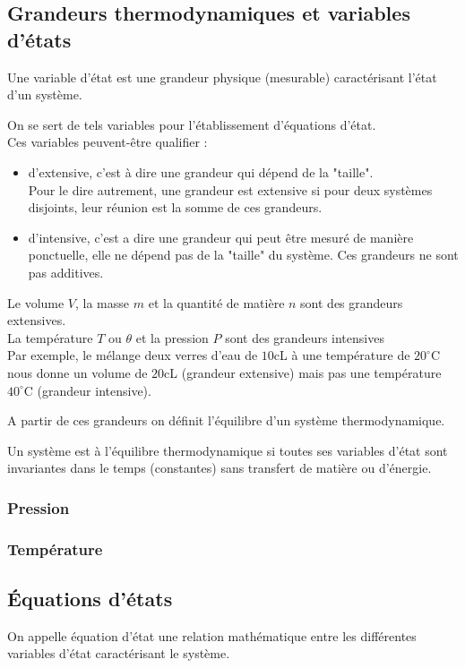 \subsection{Grandeurs thermodynamiques et variables d'états}
\begin{defi}
Une variable d'état est une grandeur physique (mesurable) caractérisant l'état d'un système.
\end{defi}
On se sert de tels variables pour l'établissement d'équations d'état.\\
\newline
Ces variables peuvent-être qualifier :
\begin{itemize}
    \item d'extensive, c'est à dire une grandeur qui dépend de la "taille".\\
    Pour le dire autrement, une grandeur est extensive si pour deux systèmes disjoints, leur réunion est la somme de ces grandeurs.
    \item d'intensive, c'est a dire une grandeur qui peut être mesuré de manière ponctuelle, elle ne dépend pas de la "taille" du système. Ces grandeurs ne sont pas additives.
\end{itemize}
\begin{ex}
Le volume $V$, la masse $m$ et la quantité de matière $n$ sont des grandeurs extensives.\\
La température $T$ ou $\theta$ et la pression $P$ sont des grandeurs intensives\\
Par exemple, le mélange deux verres d'eau de $10$cL à une température de $20^\circ$C nous donne un volume de $20$cL (grandeur extensive) mais pas une température $40^\circ$C (grandeur intensive).

\end{ex}
A partir de ces grandeurs on définit l'équilibre d'un système thermodynamique.
\begin{defi}
Un système est à l'équilibre thermodynamique si toutes ses variables d'état sont invariantes dans le temps (constantes) sans transfert de matière ou d'énergie.
\end{defi}
\subsubsection{Pression}
\subsubsection{Température}
\subsection{Équations d'états}
\begin{defi}
On appelle équation d'état une relation mathématique entre les différentes variables d'état caractérisant le système.
\end{defi}
